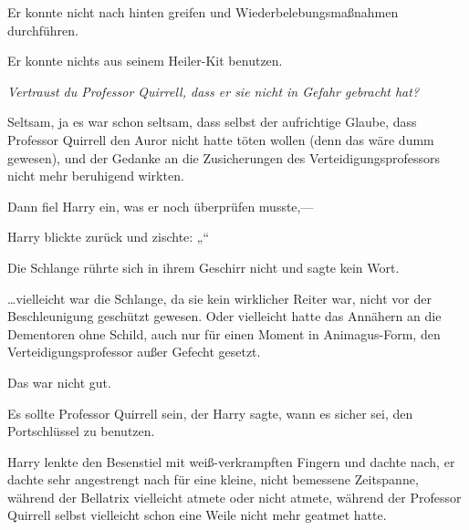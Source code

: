 Er konnte nicht nach hinten greifen und Wiederbelebungsmaßnahmen durchführen.

Er konnte nichts aus seinem Heiler-Kit benutzen.

\emph{Vertraust du Professor Quirrell, dass er sie nicht in Gefahr gebracht hat?}

Seltsam, ja es war schon seltsam, dass selbst der aufrichtige Glaube, dass Professor Quirrell den Auror nicht hatte töten wollen (denn das wäre dumm gewesen), und der Gedanke an die Zusicherungen des Verteidigungsprofessors nicht mehr beruhigend wirkten.

Dann fiel Harry ein, was er noch überprüfen musste,—

Harry blickte zurück und zischte: „“

Die Schlange rührte sich in ihrem Geschirr nicht und sagte kein Wort.

…vielleicht war die Schlange, da sie kein wirklicher Reiter war, nicht vor der Beschleunigung geschützt gewesen. Oder vielleicht hatte das Annähern an die Dementoren ohne Schild, auch nur für einen Moment in Animagus-Form, den Verteidigungsprofessor außer Gefecht gesetzt.

Das war nicht gut.

Es sollte Professor Quirrell sein, der Harry sagte, wann es sicher sei, den Portschlüssel zu benutzen.

Harry lenkte den Besenstiel mit weiß-verkrampften Fingern und dachte nach, er dachte sehr angestrengt nach für eine kleine, nicht bemessene Zeitspanne, während der Bellatrix vielleicht atmete oder nicht atmete, während der Professor Quirrell selbst vielleicht schon eine Weile nicht mehr geatmet hatte.

